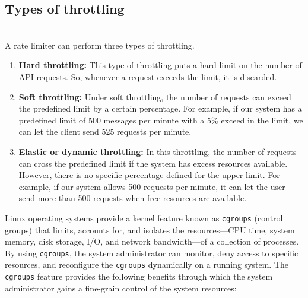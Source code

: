 \subsection{Types of throttling}\label{jy4TfMoOPypaf23FydLHO}
\\
A rate limiter can perform three types of throttling.

\begin{enumerate}
\item
\protect{}\label{fV7AuMqpJwamMqDU-fs9i}
\textbf{Hard throttling:} This type of throttling puts a hard limit on the number of API requests. So, whenever a request exceeds the limit, it is discarded.
\item
\protect{}\label{Ox-xO-LyJbr65VOLJhPwB}
\textbf{Soft throttling:} Under soft throttling, the number of requests can exceed the predefined limit by a certain percentage. For example, if our system has a predefined limit of 500 messages per minute with a 5\% exceed in the limit, we can let the client send 525 requests per minute.
\item
\protect{}\label{xUKIb35mYeh_VXF7kj_Jc}
\textbf{Elastic or dynamic throttling:} In this throttling, the number of requests can cross the predefined limit if the system has excess resources available. However, there is no specific percentage defined for the upper limit. For example, if our system allows 500 requests per minute, it can let the user send more than 500 requests when free resources are available.
\end{enumerate}

Linux operating systems provide a kernel feature known as \texttt{cgroups} (control groups) that limits, accounts for, and isolates the resources---CPU time, system memory, disk storage, I/O, and network bandwidth---of a collection of processes. By using \texttt{cgroups}, the system administrator can monitor, deny access to specific resources, and reconfigure the \texttt{cgroups} dynamically on a running system. The
\texttt{cgroups} feature provides the following benefits through which the system administrator gains a fine-grain control of the system resources:

